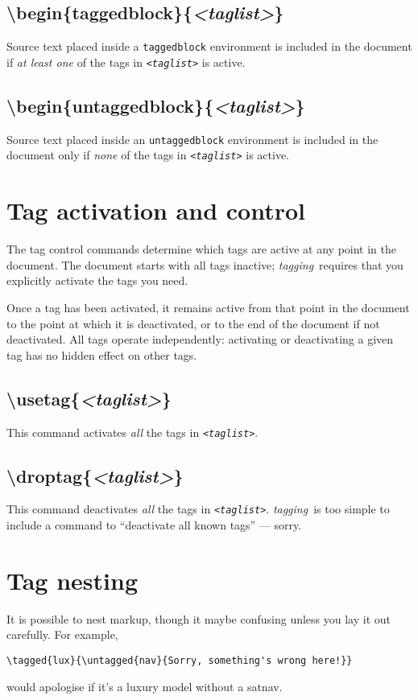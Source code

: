\documentclass[a4paper,12pt,twoside,openany]{memoir}
\newcommand{\tpname}{\textsf{\itshape tagging}}
\begin{document}
\subsection{{\ttfamily\textbackslash begin\{taggedblock\}\{{\itshape<taglist>}\}}}
Source text placed inside a \texttt{taggedblock} environment
is included in the document if \emph{at least one} of the tags in
\texttt{\itshape<taglist>} is active.
\subsection{{\ttfamily\textbackslash begin\{untaggedblock\}\{{\itshape<taglist>}\}}}
Source text placed inside an \texttt{untaggedblock} environment
is included in the document only if \emph{none} of the tags in
\texttt{\itshape<taglist>} is active.

\section{Tag activation and control}
The tag control commands determine which tags
are active at any point in the document.
The document starts with all tags inactive;
\tpname\ requires that you explicitly activate 
the tags you need.

Once a tag has been activated, it remains active from that point
in the document to the point at which it is deactivated,
or to the end of the document if not deactivated.
All tags operate independently:
activating or deactivating a given tag has no hidden effect on other tags.

\subsection{{\ttfamily\textbackslash usetag\{{\itshape<taglist>}\}}}
This command activates \emph{all} the tags in \texttt{\itshape<taglist>}.
\subsection{{\ttfamily\textbackslash droptag\{{\itshape<taglist>}\}}}
This command deactivates \emph{all} the tags in \texttt{\itshape<taglist>}.
\tpname\ is too simple to include a command 
to ``deactivate all known tags'' --- sorry.

\section{Tag nesting}
It is possible to nest markup, though it maybe confusing unless you lay it out carefully.
For example,
\begin{verbatim}
\tagged{lux}{\untagged{nav}{Sorry, something's wrong here!}}
\end{verbatim}
would apologise if it's a luxury model without a satnav.
\end{document}
